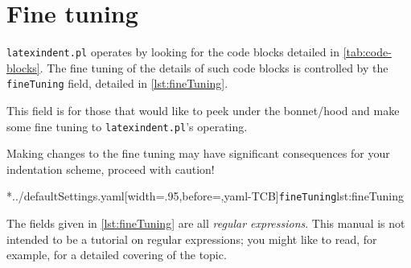 \section{Fine tuning}\label{sec:finetuning}
 \texttt{latexindent.pl} operates by looking for the code blocks detailed in
 \vref{tab:code-blocks}.
  The fine tuning of the
 details of such code blocks is controlled by the \texttt{fineTuning} field, detailed in
 \cref{lst:fineTuning}.

 This field is for those that would like to peek under the bonnet/hood and make some fine
 tuning to \texttt{latexindent.pl}'s operating.

 \begin{warning}
	 Making changes to the fine tuning may have significant consequences for your indentation scheme,
	 proceed with caution!
 \end{warning}

 \begin{widepage}
	 \cmhlistingsfromfile[style=fineTuning]*{../defaultSettings.yaml}[width=.95\linewidth,before=\centering,yaml-TCB]{\texttt{fineTuning}}{lst:fineTuning}
 \end{widepage}

 The fields given in \cref{lst:fineTuning} are all \emph{regular expressions}. This manual
 is not intended to be a tutorial on regular expressions; you might like to read, for
 example, \cite{masteringregexp} for a detailed covering of the topic.


